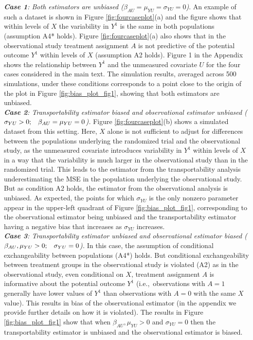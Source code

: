 \documentclass[11pt]{article}
\begin{document}
\textit{\textbf{Case 1}: Both estimators are unbiased ($\beta_{AU} = \mu_{YU} = \sigma_{YU}=0$)}. An example of such a dataset is shown in Figure \ref{fig:fourcaseplot}(a) and the figure shows that within levels of $X$ the variability in $Y^1$ is the same in both populations (assumption A4* holds). Figure \ref{fig:fourcaseplot}(a) also shows that in the observational study treatment assignment $A$ is not predictive of the potential outcome $Y^1$ within levels of $X$ (assumption A2 holds). Figure 1 in the Appendix shows the relationship between $Y^1$ and the unmeasured covariate $U$ for the four cases considered in the main text. The simulation results, averaged across 500 simulations, under these conditions corresponds to a point close to the origin of the plot in Figure \ref{fig:bias_plot_fig1}, showing that both estimators are unbiased.
\\
\textit{\textbf{Case 2}: Transportability estimator biased and observational estimator unbiased ($\sigma_{YU}>0; \hspace{.3cm} \beta_{AU} = \mu_{YU} = 0$).} Figure \ref{fig:fourcaseplot}(b) shows a simulated dataset from this setting. Here, $X$ alone is not sufficient to adjust for differences between the populations underlying the randomized trial and the observational study, as the unmeasured covariate introduces variability in $Y^1$ within levels of $X$ in a way that the variability is much larger in the observational study than in the randomized trial. This leads to the estimator from the transportability analysis underestimating the MSE in the population underlying the observational study. But as condition A2 holds, the estimator from the observational analysis is unbiased. As expected, the points for which $\sigma_{YU}$ is the only nonzero parameter appear in the upper-left quadrant of Figure \ref{fig:bias_plot_fig1}, corresponding to the observational estimator being unbiased and the transportability estimator having a negative bias that increases as $\sigma_{YU}$ increases.
\\
\textit{\textbf{Case 3}: Transportability estimator unbiased and observational estimator biased ($\beta_{AU}, \mu_{YU} > 0; \hspace{.3cm} \sigma_{YU}=0$).} In this case, the assumption of conditional exchangeability between populations (A4*) holds. But conditional exchangeability between treatment groups in the observational study is violated (A2) as in the observational study, even conditional on $X$, treatment assignment $A$ is informative about the potential outcome $Y^1$ (i.e.,~observations with $A=1$ generally have lower values of $Y^1$ than observations with $A=0$ with the same $X$ value). This results in bias of the observational estimator (in the appendix we provide further details on how it is violated). The results in Figure \ref{fig:bias_plot_fig1} show that when $\beta_{AU}, \mu_{YU} > 0$ and $\sigma_{YU}=0$ then the transportability estimator is unbiased and the observational estimator is biased.
\end{document}
